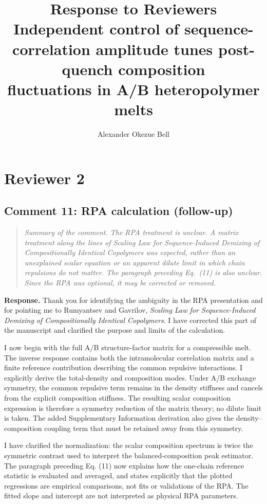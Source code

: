 \documentclass[11pt,letterpaper]{article}
\title{Response to Reviewers\\[4pt]
\large Independent control of sequence-correlation amplitude tunes post-quench composition\\
fluctuations in A/B heteropolymer melts}
\author{Alexander Okezue Bell}
\date{}
\begin{document}
\maketitle
\pagestyle{plain}
\section*{Reviewer 2}
\subsection*{Comment 11: RPA calculation (follow-up)}
\begin{quote}
\textit{Summary of the comment. The RPA treatment is unclear. A matrix treatment along the lines of \emph{Scaling Law for Sequence-Induced Demixing of Compositionally Identical Copolymers} was expected, rather than an unexplained scalar equation or an apparent dilute limit in which chain repulsions do not matter. The paragraph preceding Eq.~(11) is also unclear. Since the RPA was optional, it may be corrected or removed.}
\end{quote}
\textcolor{responseblue}{\textbf{Response.}} Thank you for identifying the ambiguity in the RPA presentation and for pointing me to Rumyantsev and Gavrilov, \emph{Scaling Law for Sequence-Induced Demixing of Compositionally Identical Copolymers}. I have corrected this part of the manuscript and clarified the purpose and limits of the calculation.

I now begin with the full A/B structure-factor matrix for a compressible melt. The inverse response contains both the intramolecular correlation matrix and a finite reference contribution describing the common repulsive interactions. I explicitly derive the total-density and composition modes. Under A/B exchange symmetry, the common repulsive term remains in the density stiffness and cancels from the explicit composition stiffness. The resulting scalar composition expression is therefore a symmetry reduction of the matrix theory; no dilute limit is taken. The added Supplementary Information derivation also gives the density--composition coupling term that must be retained away from this symmetry.

I have clarified the normalization: the scalar composition spectrum is twice the symmetric contrast used to interpret the balanced-composition peak estimator. The paragraph preceding Eq. (11) now explains how the one-chain reference statistic is evaluated and averaged, and states explicitly that the plotted regressions are empirical comparisons, not fits or validations of the RPA. The fitted slope and intercept are not interpreted as physical RPA parameters.
\end{document}
